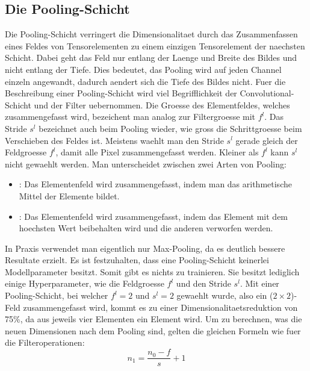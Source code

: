 \subsection{Die Pooling-Schicht}
Die Pooling-Schicht verringert die Dimensionalitaet durch das Zusammenfassen eines Feldes
von Tensorelementen zu einem einzigen Tensorelement der naechsten Schicht.
Dabei geht das Feld nur entlang der Laenge und Breite des Bildes und
nicht entlang der Tiefe. Dies bedeutet, das Pooling wird auf jeden Channel
einzeln angewandt, dadurch aendert sich die Tiefe des Bildes nicht.
\para{}
Fuer die Beschreibung einer Pooling-Schicht wird viel Begrifflichkeit der
Convolutional-Schicht und der Filter uebernommen.
Die Groesse des Elementfeldes, welches zusammengefasst wird, bezeichent man analog zur
Filtergroesse mit $f^l$. Das Stride $s^l$ bezeichnet auch beim Pooling wieder, wie
gross die Schrittgroesse beim Verschieben des Feldes ist. Meistens waehlt man den
Stride $s^l$ gerade gleich der Feldgroesse $f^l$, damit alle Pixel
zusammengefasst werden. Kleiner als $f^l$ kann $s^l$ nicht gewaehlt werden.
\para{}
Man unterscheidet zwischen zwei Arten von Pooling:
\begin{itemize}
\item{: Das Elementenfeld wird zusammengefasst, indem
    man das arithmetische Mittel der Elemente bildet.}
\item{: Das Elementenfeld wird zusammengefasst, indem das
    Element mit dem hoechsten Wert beibehalten wird und die anderen verworfen werden.}
\end{itemize}
In Praxis verwendet man eigentlich nur Max-Pooling, da es deutlich bessere
Resultate erzielt.
\para{}
Es ist festzuhalten, dass eine Pooling-Schicht keinerlei Modellparameter
besitzt. Somit gibt es nichts zu trainieren. Sie besitzt lediglich einige
Hyperparameter, wie die Feldgroesse $f^l$ und den Stride $s^l$.
\para{}
Mit einer Pooling-Schicht, bei welcher $f^l = 2$ und $s^l = 2$ gewaehlt wurde, also
ein ($2 \times 2$)-Feld zusammengefasst wird, kommt es zu einer
Dimensionalitaetsreduktion von 75\%, da aus jeweils vier Elementen ein Element wird.
\para{}
Um zu berechnen, was die neuen Dimensionen nach dem Pooling sind, gelten die
gleichen Formeln wie fuer die Filteroperationen:
\\
\begin{equation}
  n_1 = \frac{n_0 - f}{s} + 1
\end{equation}
\\


